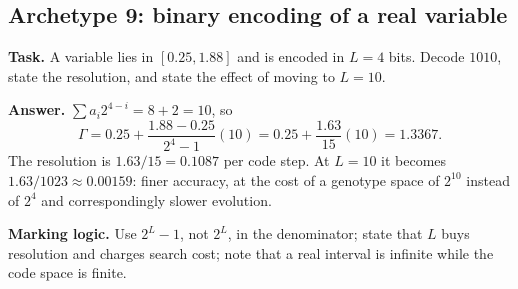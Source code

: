 \documentclass[11pt,a4paper]{article}
\begin{document}
\subsection{Archetype 9: binary encoding of a real variable}
\textbf{Task.} A variable lies in $[0.25,1.88]$ and is encoded in $L=4$ bits.
Decode $1010$, state the resolution, and state the effect of moving to
$L=10$.

\textbf{Answer.} $\sum a_i2^{4-i}=8+2=10$, so
\[
  \Gamma=0.25+\frac{1.88-0.25}{2^4-1}(10)=0.25+\frac{1.63}{15}(10)=1.3367 .
\]
The resolution is $1.63/15=0.1087$ per code step. At $L=10$ it becomes
$1.63/1023\approx0.00159$: finer accuracy, at the cost of a genotype space of
$2^{10}$ instead of $2^{4}$ and correspondingly slower evolution.

\textbf{Marking logic.} Use $2^L-1$, not $2^L$, in the denominator; state that
$L$ buys resolution and charges search cost; note that a real interval is
infinite while the code space is finite.

\clearpage
\end{document}
